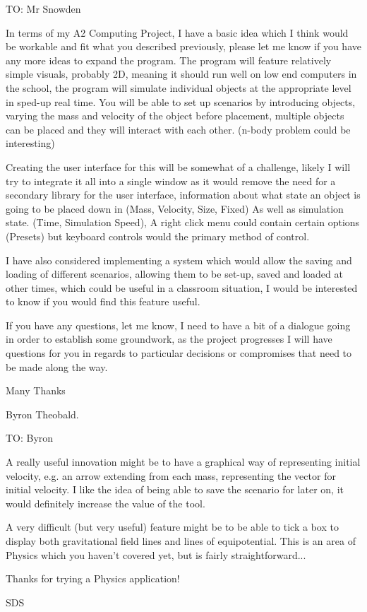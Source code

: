 {\parskip=10pt

\color{RedOrange}

TO: Mr Snowden

In terms of my A2 Computing Project, I have a basic idea which I think would be workable and fit what you described previously, please let me know if you have any more ideas to expand the program.
The program will feature relatively simple visuals, probably 2D, meaning it should run well on low end computers in the school, the program will simulate individual objects at the appropriate level in sped-up real time.
You will be able to set up scenarios by introducing objects, varying the mass and velocity of the object before placement, multiple objects can be placed and they will interact with each other. (n-body problem could be interesting)

Creating the user interface for this will be somewhat of a challenge, likely I will try to integrate it all into a single window as it would remove the need for a secondary library for the user interface, information about what state an object is going to be placed down in (Mass, Velocity, Size, Fixed) As well as simulation state. (Time, Simulation Speed), A right click menu could contain certain options (Presets) but keyboard controls would the primary method of control.

I have also considered implementing a system which would allow the saving and loading of different scenarios, allowing them to be set-up, saved and loaded at other times, which could be useful in a classroom situation, I would be interested to know if you would find this feature useful.

If you have any questions, let me know, I need to have a bit of a dialogue going in order to establish some groundwork, as the project progresses I will have questions for you in regards to particular decisions or compromises that need to be made along the way.

Many Thanks

Byron Theobald.

\pagebreak

\color{Blue}
TO: Byron

A really useful innovation might be to have a graphical way of representing initial velocity, e.g. an arrow extending from each mass, representing the vector for initial velocity.
I like the idea of being able to save the scenario for later on, it would definitely increase the value of the tool.

A very difficult (but very useful) feature might be to be able to tick a box to display both gravitational field lines and lines of equipotential. This is an area of Physics which you haven’t covered yet, but is fairly straightforward...

Thanks for trying a Physics application!

SDS

}